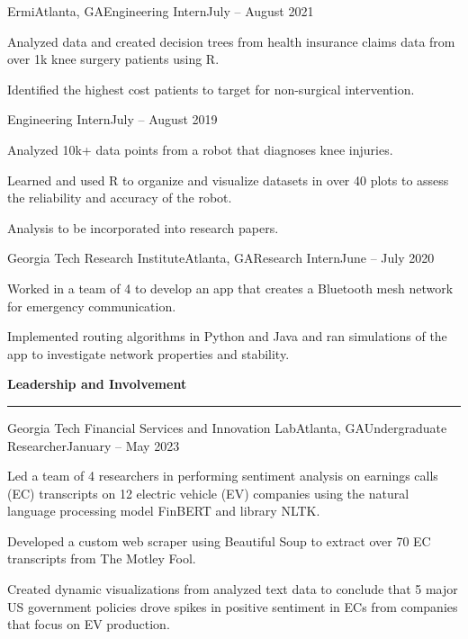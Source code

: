 \documentclass{article}
\newcommand{\horizontal}{\vspace{2pt}\hrule}
\newcommand{\sectitle}[1]{\vspace{2pt} \textbf{\large #1} \horizontal}
\begin{document}
\begin{flushleft}
    \begin{experience}{Ermi}{Atlanta, GA}{Engineering Intern}{July -- August 2021}
        \item Analyzed data and created decision trees from health insurance claims data from over 1k knee surgery patients using R.
        \item Identified the highest cost patients to target for non-surgical intervention.
    \end{experience}
    \begin{subexperience}{Engineering Intern}{July -- August 2019}
        \item Analyzed 10k+ data points from a robot that diagnoses knee injuries.
        \item Learned and used R to organize and visualize datasets in over 40 plots to assess the reliability and accuracy of the robot.
        \item Analysis to be incorporated into research papers.
    \end{subexperience}

    \begin{experience}{Georgia Tech Research Institute}{Atlanta, GA}{Research Intern}{June -- July 2020}
        \item Worked in a team of 4 to develop an app that creates a Bluetooth mesh network for emergency communication.
        \item Implemented routing algorithms in Python and Java and ran simulations of the app to investigate network properties and stability.
    \end{experience}


\sectitle{Leadership and Involvement}

    \begin{experience}{Georgia Tech Financial Services and Innovation Lab}{Atlanta, GA}{Undergraduate Researcher}{January -- May 2023}
        \item Led a team of 4 researchers in performing sentiment analysis on earnings calls (EC) transcripts on 12 electric vehicle (EV) companies using the natural language processing model FinBERT and library NLTK.
        \item Developed a custom web scraper using Beautiful Soup to extract over 70 EC transcripts from The Motley Fool.
        \item Created dynamic visualizations from analyzed text data to conclude that 5 major US government policies drove spikes in positive sentiment in ECs from companies that focus on EV production.
    \end{experience}


\end{flushleft}
\end{document}
